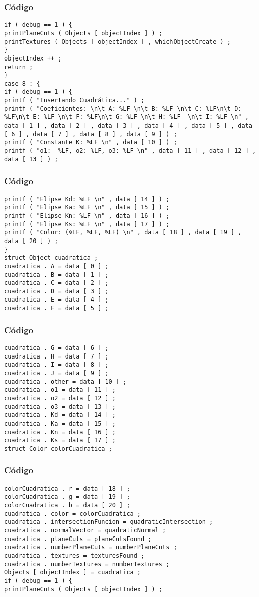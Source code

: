 \documentclass{beamer}
\begin{document}
\begin{frame}[fragile]
\frametitle{C\'odigo}
\begin{verbatim}
if ( debug == 1 ) { 
printPlaneCuts ( Objects [ objectIndex ] ) ; 
printTextures ( Objects [ objectIndex ] , whichObjectCreate ) ; 
} 
objectIndex ++ ; 
return ; 
} 
case 8 : { 
if ( debug == 1 ) { 
printf ( "Insertando Cuadrática..." ) ; 
printf ( "Coeficientes: \n\t A: %LF \n\t B: %LF \n\t C: %LF\n\t D: %LF\n\t E: %LF \n\t F: %LF\n\t G: %LF \n\t H: %LF  \n\t I: %LF \n" , data [ 1 ] , data [ 2 ] , data [ 3 ] , data [ 4 ] , data [ 5 ] , data [ 6 ] , data [ 7 ] , data [ 8 ] , data [ 9 ] ) ; 
printf ( "Constante K: %LF \n" , data [ 10 ] ) ; 
printf ( "o1:  %LF, o2: %LF, o3: %LF \n" , data [ 11 ] , data [ 12 ] , data [ 13 ] ) ; 
\end{verbatim}
\end{frame}
\begin{frame}[fragile]
\frametitle{C\'odigo}
\begin{verbatim}
printf ( "Elipse Kd: %LF \n" , data [ 14 ] ) ; 
printf ( "Elipse Ka: %LF \n" , data [ 15 ] ) ; 
printf ( "Elipse Kn: %LF \n" , data [ 16 ] ) ; 
printf ( "Elipse Ks: %LF \n" , data [ 17 ] ) ; 
printf ( "Color: (%LF, %LF, %LF) \n" , data [ 18 ] , data [ 19 ] , data [ 20 ] ) ; 
} 
struct Object cuadratica ; 
cuadratica . A = data [ 0 ] ; 
cuadratica . B = data [ 1 ] ; 
cuadratica . C = data [ 2 ] ; 
cuadratica . D = data [ 3 ] ; 
cuadratica . E = data [ 4 ] ; 
cuadratica . F = data [ 5 ] ; 
\end{verbatim}
\end{frame}
\begin{frame}[fragile]
\frametitle{C\'odigo}
\begin{verbatim}
cuadratica . G = data [ 6 ] ; 
cuadratica . H = data [ 7 ] ; 
cuadratica . I = data [ 8 ] ; 
cuadratica . J = data [ 9 ] ; 
cuadratica . other = data [ 10 ] ; 
cuadratica . o1 = data [ 11 ] ; 
cuadratica . o2 = data [ 12 ] ; 
cuadratica . o3 = data [ 13 ] ; 
cuadratica . Kd = data [ 14 ] ; 
cuadratica . Ka = data [ 15 ] ; 
cuadratica . Kn = data [ 16 ] ; 
cuadratica . Ks = data [ 17 ] ; 
struct Color colorCuadratica ; 
\end{verbatim}
\end{frame}
\begin{frame}[fragile]
\frametitle{C\'odigo}
\begin{verbatim}
colorCuadratica . r = data [ 18 ] ; 
colorCuadratica . g = data [ 19 ] ; 
colorCuadratica . b = data [ 20 ] ; 
cuadratica . color = colorCuadratica ; 
cuadratica . intersectionFuncion = quadraticIntersection ; 
cuadratica . normalVector = quadraticNormal ; 
cuadratica . planeCuts = planeCutsFound ; 
cuadratica . numberPlaneCuts = numberPlaneCuts ; 
cuadratica . textures = texturesFound ; 
cuadratica . numberTextures = numberTextures ; 
Objects [ objectIndex ] = cuadratica ; 
if ( debug == 1 ) { 
printPlaneCuts ( Objects [ objectIndex ] ) ; 
\end{verbatim}
\end{frame}
\end{document}
